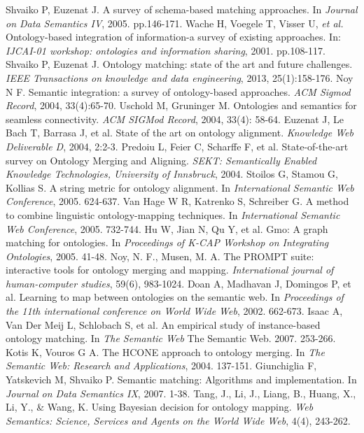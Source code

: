 \documentclass[twoside]{article}
\begin{document}
\begin{multicols}{2}
\begin{thebibliography}{99}
 Shvaiko P, Euzenat J. A survey of schema-based matching approaches. In {\it Journal on Data Semantics IV}, 2005. pp.146-171.
 Wache H, Voegele T, Visser U, {\it et al.} Ontology-based integration of information-a survey of existing approaches. In: {\it IJCAI-01 workshop: ontologies and information sharing}, 2001. pp.108-117.
 Shvaiko P, Euzenat J. Ontology matching: state of the art and future challenges. {\it IEEE Transactions on knowledge and data engineering}, 2013, 25(1):158-176.
 Noy N F. Semantic integration: a survey of ontology-based approaches. {\it ACM Sigmod Record}, 2004, 33(4):65-70.
 Uschold M, Gruninger M. Ontologies and semantics for seamless connectivity. {\it ACM SIGMod Record}, 2004, 33(4): 58-64.
 Euzenat J, Le Bach T, Barrasa J, et al. State of the art on ontology alignment. {\it Knowledge Web Deliverable D}, 2004, 2:2-3.
 Predoiu L, Feier C, Scharffe F, et al. State-of-the-art survey on Ontology Merging and Aligning. {\it SEKT: Semantically Enabled Knowledge Technologies, University of Innsbruck}, 2004.
 Stoilos G, Stamou G, Kollias S. A string metric for ontology alignment. In {\it International Semantic Web Conference}, 2005. 624-637.
 Van Hage W R, Katrenko S, Schreiber G. A method to combine linguistic ontology-mapping techniques. In {\it International Semantic Web Conference}, 2005. 732-744.
 Hu W, Jian N, Qu Y, et al. Gmo: A graph matching for ontologies. In {\it Proceedings of K-CAP Workshop on Integrating Ontologies}, 2005. 41-48.
 Noy, N. F., Musen, M. A. The PROMPT suite: interactive tools for ontology merging and mapping. {\it International journal of human-computer studies}, 59(6), 983-1024.
 Doan A, Madhavan J, Domingos P, et al. Learning to map between ontologies on the semantic web. In {\it Proceedings of the 11th international conference on World Wide Web}, 2002. 662-673.
 Isaac A, Van Der Meij L, Schlobach S, et al. An empirical study of instance-based ontology matching. In {\it The Semantic Web} The Semantic Web. 2007. 253-266.
 Kotis K, Vouros G A. The HCONE approach to ontology merging. In {\it The Semantic Web: Research and Applications}, 2004. 137-151.
 Giunchiglia F, Yatskevich M, Shvaiko P. Semantic matching: Algorithms and implementation. In {\it Journal on Data Semantics IX},  2007. 1-38.
 Tang, J., Li, J., Liang, B., Huang, X., Li, Y., \& Wang, K. Using Bayesian decision for ontology mapping. {\it Web Semantics: Science, Services and Agents on the World Wide Web}, 4(4), 243-262.

\end{thebibliography}
\end{multicols}
\end{document}

